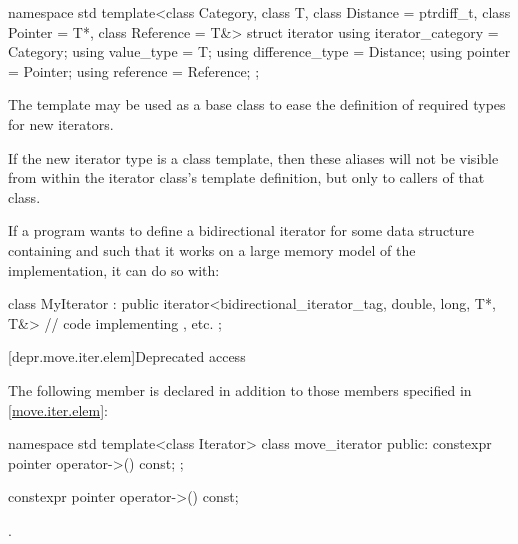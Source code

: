 %
\begin{codeblock}
namespace std {
  template<class Category, class T, class Distance = ptrdiff_t,
           class Pointer = T*, class Reference = T&>
  struct iterator {
    using iterator_category = Category;
    using value_type        = T;
    using difference_type   = Distance;
    using pointer           = Pointer;
    using reference         = Reference;
  };
}
\end{codeblock}

\pnum
The
template may be used as a base class to ease the definition of required types
for new iterators.

\pnum
\begin{note}
If the new iterator type is a class template, then these aliases
will not be visible from within the iterator class's template definition, but
only to callers of that class.
\end{note}

\pnum
\begin{example}
If a \Cpp{} program wants to define a bidirectional iterator for some data
structure containing  and such that it works on a large memory
model of the implementation, it can do so with:

\begin{codeblock}
class MyIterator :
  public iterator<bidirectional_iterator_tag, double, long, T*, T&> {
  // code implementing \tcode{++}, etc.
};
\end{codeblock}
\end{example}

[depr.move.iter.elem]{Deprecated  access}

\pnum
The following member is declared in addition to those members
specified in \ref{move.iter.elem}:

\begin{codeblock}
namespace std {
  template<class Iterator>
  class move_iterator {
  public:
    constexpr pointer operator->() const;
  };
}
\end{codeblock}

%
\begin{itemdecl}
constexpr pointer operator->() const;
\end{itemdecl}

\begin{itemdescr}
\pnum
\returns
{}.
\end{itemdescr}

